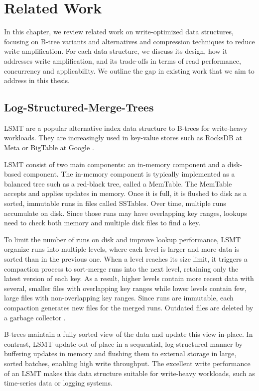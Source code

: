 \chapter{Related Work}
\label{chap:related-work}
In this chapter, we review related work on write-optimized data structures, focusing on B-tree variants and alternatives and compression techniques to reduce write amplification.
For each data structure, we discuss its design, how it addresses write amplification, and its trade-offs in terms of read performance, concurrency and applicability.
We outline the gap in existing work that we aim to address in this thesis.

\section{Log-Structured-Merge-Trees}
\ac{LSMT} \cite{oneil1996log} are a popular alternative index data structure to B-trees for write-heavy workloads.
They are increasingly used in key-value stores such as RocksDB at Meta \cite{rocksdb} or BigTable at Google \cite{chang2008bigtable}.

\ac{LSMT} consist of two main components: an in-memory component and a disk-based component.
The in-memory component is typically implemented as a balanced tree such as a red-black tree, called a MemTable.
The MemTable accepts and applies updates in memory.
Once it is full, it is flushed to disk as a sorted, immutable runs in files called SSTables.
Over time, multiple runs accumulate on disk.
Since those runs may have overlapping key ranges, lookups need to check both memory and multiple disk files to find a key.

To limit the number of runs on disk and improve lookup performance, \ac{LSMT} organize runs into multiple levels, where each level is larger and more data is sorted than in the previous one.
When a level reaches its size limit, it triggers a compaction process to sort-merge runs into the next level, retaining only the latest version of each key.
As a result, higher levels contain more recent data with several, smaller files with overlapping key ranges while lower levels contain few, large files with non-overlapping key ranges.
Since runs are immutable, each compaction generates new files for the merged runs.
Outdated files are deleted by a garbage collector \cite{sarkar2022lsmt}.


B-trees maintain a fully sorted view of the data and update this view in-place.
In contrast, \ac{LSMT} update out-of-place in a sequential, log-structured manner by buffering updates in memory and flushing them to external storage in large, sorted batches, enabling high write throughput.
The excellent write performance of an \ac{LSMT} makes this data structure suitable for write-heavy workloads, such as time-series data or logging systems.

